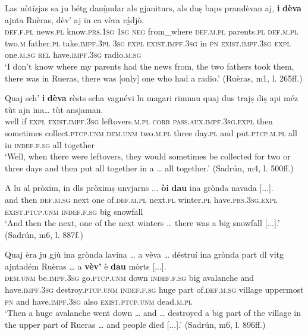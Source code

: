 \ea
\label{ex:exist.da3}
\gll    Las nòtízjas sa ju bétg danù̱ndar als gjaniturs, als duṣ baps prandèvan aj, \textbf{i} \textbf{dèva} ajnta Ruèras, dèv’ aj in ca vèva rá̱djò. \\
\textsc{def.f.pl} news.\textsc{pl} know.\textsc{prs.1sg} \textsc{1sg} \textsc{neg} from\_where \textsc{def.m.pl} parents.\textsc{pl} \textsc{def.m.pl} two.\textsc{m} father.\textsc{pl} take.\textsc{impf.3pl} \textsc{3sg} \textsc{expl} \textsc{exist.impf.3sg} in \textsc{pn} \textsc{exist.impf.3sg} \textsc{expl}  one.\textsc{m.sg} \textsc{rel} have.\textsc{impf.3sg} radio.\textsc{m.sg}\\
\glt `I don’t know where my parents had the news from, the two fathers took them, there was in Rueras, there was [only] one who had a radio.' (Ruèras, m1, l. 265ff.)
\z

\ea
\label{ex:exist.da4}
\gll  Quaj sch’ \textbf{i} \textbf{dèva} rèsts scha vagnévi lu magari rimnau quaj dus trajṣ diṣ api méz tùt ajn ina… tùt ansjaman.  \\
well if \textsc{expl} \textsc{exist.impf.3sg} leftovers.\textsc{m.pl} \textsc{corr} \textsc{pass.aux.impf.3sg.expl} then sometimes collect.\textsc{ptcp.unm} \textsc{dem.unm} two.\textsc{m.pl} three day.\textsc{pl} and put.\textsc{ptcp.m.pl} all in  \textsc{indef.f.sg} all together\\
\glt `Well, when there were leftovers, they would sometimes be collected for two or three days and then put all together in a … all together.' (Sadrún, m4, l. 500ff.)
\z

\ea
\label{ex:exist.da5}
\gll    A lu al pròxim, in dls pròximṣ unvjarns ... \textbf{òi} \textbf{dau} ina grònda navada [...].\\
and then \textsc{def.m.sg} next one of.\textsc{def.m.pl} next.\textsc{pl} winter.\textsc{pl} {} have.\textsc{prs.3sg}.\textsc{expl} \textsc{exist.ptcp.unm} \textsc{indef.f.sg} big snowfall \\
\glt `And then the next, one of the next winters … there was a big snowfall [...].' (Sadrún, m6, l. 887f.)
\z

\ea
\label{ex:exist.da6}
\gll    Quaj èra ju gjù ina grònda lavina … a vèva … déstruí ina grònda part dl vitg ajntadém Ruèras … a \textbf{vèv’} è \textbf{dau} mòrts [...].\\
\textsc{dem.unm} be.\textsc{impf.3sg} go.\textsc{ptcp.unm} down \textsc{indef.f.sg} big avalanche {} and have.\textsc{impf.3sg} {} destroy.\textsc{ptcp.unm} \textsc{indef.f.sg} huge part of.\textsc{def.m.sg} village uppermost \textsc{pn} {} and have.\textsc{impf.3sg} also \textsc{exist.ptcp.unm} dead.\textsc{m.pl}\\
\glt `Then a huge avalanche went down … and … destroyed a big part of the village in the upper part of Rueras … and people died [...].' (Sadrún, m6, l. 896ff.)
\z

